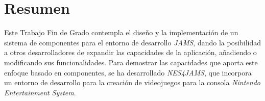 \chapter{Resumen} \label{ch:resumen}

Este Trabajo Fin de Grado contempla el diseño y
la implementación de un sistema de
componentes para el entorno de desarrollo \textit{JAMS}, dando la
posibilidad a otros desarrolladores de expandir las capacidades de la
aplicación, añadiendo o modificando sus funcionalidades.
Para demostrar las capacidades que aporta este enfoque
basado en componentes, se ha desarrollado \textit{NES4JAMS},
que incorpora un entorno de desarrollo para la creación
de videojuegos para la consola \textit{Nintendo Entertainment System}.
